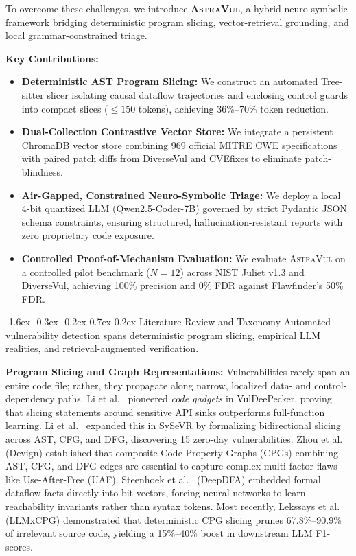 \documentclass[10pt,twocolumn]{article}
\makeatletter
\renewcommand\section{\@startsection{section}{1}{\z@}%
  {-1.6ex \@plus -0.3ex \@minus -0.2ex}%
  {0.7ex \@plus 0.2ex}%
  {\normalfont\large\bfseries}}
\makeatother
\begin{document}
To overcome these challenges, we introduce \textbf{\textsc{AstraVul}}, a hybrid neuro-symbolic framework bridging deterministic program slicing, vector-retrieval grounding, and local grammar-constrained triage.

\vspace{1pt}\noindent\textbf{Key Contributions:}
\begin{itemize}[leftmargin=9pt,topsep=1pt,itemsep=0.5pt]
    \item \textbf{Deterministic AST Program Slicing:} We construct an automated Tree-sitter slicer isolating causal dataflow trajectories and enclosing control guards into compact slices ($\le 150$ tokens), achieving 36\%--70\% token reduction.
    \item \textbf{Dual-Collection Contrastive Vector Store:} We integrate a persistent ChromaDB vector store combining 969 official MITRE CWE specifications with paired patch diffs from DiverseVul and CVEfixes to eliminate patch-blindness.
    \item \textbf{Air-Gapped, Constrained Neuro-Symbolic Triage:} We deploy a local 4-bit quantized LLM (Qwen2.5-Coder-7B) governed by strict Pydantic JSON schema constraints, ensuring structured, hallucination-resistant reports with zero proprietary code exposure.
    \item \textbf{Controlled Proof-of-Mechanism Evaluation:} We evaluate \textsc{AstraVul} on a controlled pilot benchmark ($N=12$) across NIST Juliet v1.3 and DiverseVul, achieving 100\% precision and 0\% FDR against Flawfinder's 50\% FDR.
\end{itemize}

\section{Literature Review and Taxonomy}
Automated vulnerability detection spans deterministic program slicing, empirical LLM realities, and retrieval-augmented verification.

\vspace{1pt}\noindent\textbf{Program Slicing and Graph Representations:}
Vulnerabilities rarely span an entire code file; rather, they propagate along narrow, localized data- and control-dependency paths. Li et al.~\cite{li2018vuldeepecker} pioneered \textit{code gadgets} in VulDeePecker, proving that slicing statements around sensitive API sinks outperforms full-function learning. Li et al.~\cite{li2021sysevr} expanded this in SySeVR by formalizing bidirectional slicing across AST, CFG, and DFG, discovering 15 zero-day vulnerabilities. Zhou et al.~\cite{zhou2019devign} (Devign) established that composite Code Property Graphs (CPGs) combining AST, CFG, and DFG edges are essential to capture complex multi-factor flaws like Use-After-Free (UAF). Steenhoek et al.~\cite{steenhoek2024deepdfa} (DeepDFA) embedded formal dataflow facts directly into bit-vectors, forcing neural networks to learn reachability invariants rather than syntax tokens. Most recently, Lekssays et al.~\cite{lekssays2025llmxcpg} (LLMxCPG) demonstrated that deterministic CPG slicing prunes 67.8\%--90.9\% of irrelevant source code, yielding a 15\%--40\% boost in downstream LLM F1-scores.
\end{document}
